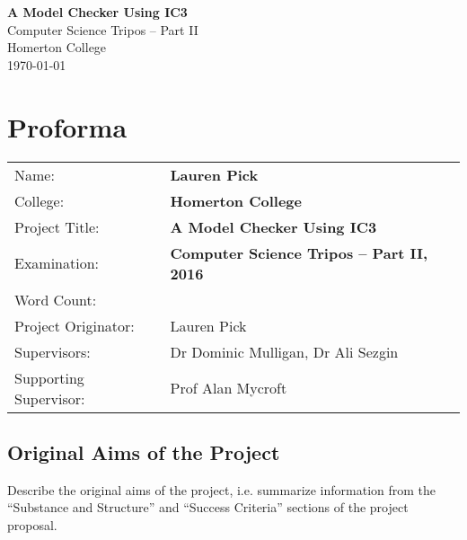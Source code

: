 \documentclass[12pt,a4paper,twoside,openright]{report}
\begin{document}





\pagestyle{empty}


\vspace*{60mm}
\begin{center}
\Huge
\textbf{A Model Checker Using IC3} \\[5mm]
Computer Science Tripos -- Part II \\[5mm]
Homerton College \\[5mm]
\today  %
\end{center}


\pagestyle{plain}

\chapter*{Proforma}

{\large
\begin{tabular}{ll}
Name:                  & \bf Lauren Pick                           \\
College:               & \bf Homerton College                      \\
Project Title:         & \bf A Model Checker Using IC3             \\
Examination:        & \bf Computer Science Tripos -- Part II, 2016 \\
Word Count:            & \bf                                       \\
Project Originator:    & Lauren Pick                               \\
Supervisors:           & Dr Dominic Mulligan, Dr Ali Sezgin        \\ 
Supporting Supervisor: & Prof Alan Mycroft
\end{tabular}
}


\section*{Original Aims of the Project}

Describe the original aims of the project, i.e. summarize information from
the ``Substance and Structure'' and ``Success Criteria'' sections of the
project proposal.
\end{document}
